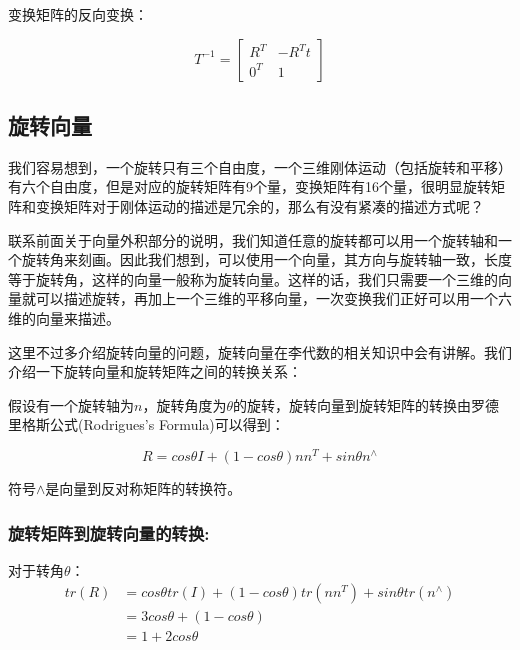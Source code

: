 \documentclass[10pt, oneside]{book}
\begin{document}
变换矩阵的反向变换：

\begin{equation}
    T^{-1} =
    \begin{bmatrix}
        R^T & -R^Tt\\
        0^T & 1
    \end{bmatrix}
\end{equation}

\subsection{旋转向量}

我们容易想到，一个旋转只有三个自由度，一个三维刚体运动（包括旋转和平移）有六个自由度，但是对应的旋转矩阵有9个量，变换矩阵有16个量，很明显旋转矩阵和变换矩阵对于刚体运动的描述是冗余的，那么有没有紧凑的描述方式呢？

联系前面关于向量外积部分的说明，我们知道任意的旋转都可以用一个旋转轴和一个旋转角来刻画。因此我们想到，可以使用一个向量，其方向与旋转轴一致，长度等于旋转角，这样的向量一般称为旋转向量。这样的话，我们只需要一个三维的向量就可以描述旋转，再加上一个三维的平移向量，一次变换我们正好可以用一个六维的向量来描述。

这里不过多介绍旋转向量的问题，旋转向量在李代数的相关知识中会有讲解。我们介绍一下旋转向量和旋转矩阵之间的转换关系：

假设有一个旋转轴为$n$，旋转角度为$\theta$的旋转，旋转向量到旋转矩阵的转换由罗德里格斯公式(Rodrigues's Formula)可以得到：

\begin{equation}
    R = cos\theta I + (1-cos\theta)nn^T + sin\theta n^{\wedge}
\end{equation}

符号$\wedge$是向量到反对称矩阵的转换符。

\subsubsection{旋转矩阵到旋转向量的转换:}

对于转角$\theta$：
\begin{equation}
    \begin{aligned} %
        tr(R) &= cos\theta tr(I) + (1-cos\theta)tr(nn^T) + sin\theta tr(n^\wedge)\\
            &= 3cos\theta + (1-cos\theta)\\
            &= 1 + 2cos\theta
    \end{aligned}
\end{equation}
\end{document}
